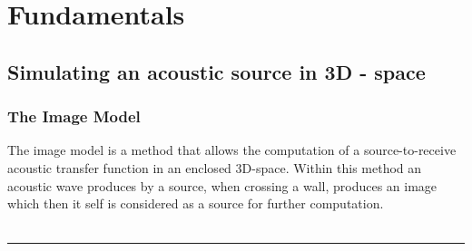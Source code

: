 \chapter{Fundamentals}
\label{chap:fundamentals}

\section{Simulating an acoustic source in 3D - space}
\subsection{The Image Model}
The image model is a method that allows the computation of a source-to-receive acoustic transfer function in an enclosed 3D-space. Within this method an acoustic wave produces by a source, when crossing a wall, produces an image which then it self is considered as a source for further computation.\cite{Allen1979}
\\\\
\rule{\textwidth}{0.4pt}

